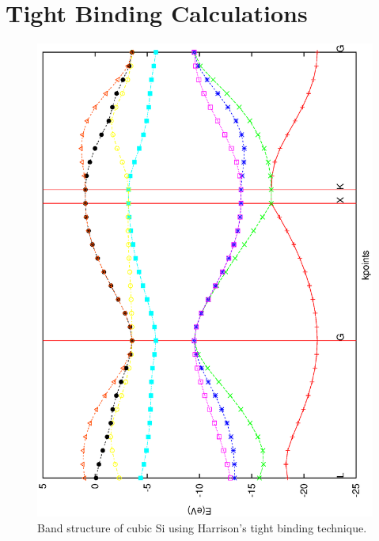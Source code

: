 \section{Tight Binding Calculations}
\begin{figure}
\begin{center}
\includegraphics[scale=0.5,angle=270]{si_band.eps}
\caption{Band structure of cubic Si using Harrison's tight binding
technique.}
\label{si-band}
\end{center}
\end{figure}


